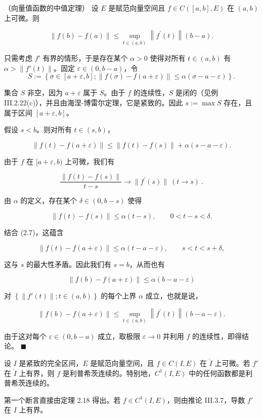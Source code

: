 \begin{theorem}

（向量值函数的中值定理） 设 $E$ 是赋范向量空间且 $f \in C([a, b], E)$ 在 $(a, b)$ 上可微。则

\[
\left\|f(b)-f(a)\right\|\leq\sup_{t\in(a,b)}\left\|f^{\prime}(t)\right\|(b-a).
\]

\proofhead
只需考虑 $f'$ 有界的情形，于是存在某个 $\alpha > 0$ 使得对所有 $t \in (a, b)$ 有 $\alpha > \|f'(t)\|$。固定 $\varepsilon \in (0, b - a)$，令
\begin{equation}
{S}:=\left\{\sigma\in[a+\varepsilon,b];\|f(\sigma)-f(a+\varepsilon)\|\leq\alpha(\sigma-a-\varepsilon)\right\}.
\end{equation}

集合 $S$ 非空，因为 $a + \varepsilon$ 属于 $S$。由于 $f$ 的连续性，$S$ 是闭的（见例 III.2.22(c)），并且由海涅-博雷尔定理，它是紧致的。因此 $s := \max S$ 存在，且属于区间 $[a + \varepsilon, b]$。

假设 $s < b$。则对所有 $ t \in (s, b) $，

\[
\left\|f(t)-f(a+\varepsilon)\right\|\leq\left\|f(t)-f(s)\right\|+\alpha(s-a-\varepsilon).
\]

由于 $f$ 在 $[a+\varepsilon,b)$ 上可微，我们有

\[
\frac{\|f(t)-f(s)\|}{t-s}\to\|f^{\prime}(s)\|\ (t\to s)~.
\]

由 $ \alpha $ 的定义，存在某个 $ \delta \in (0, b - s) $ 使得

\[
\left\|f(t)-f(s)\right\|\leq\alpha(t-s),\qquad0<t-s<\delta.
\]

结合 (2.7)，这蕴含

\[
\left\|f(t)-f(a+\varepsilon)\right\|\leq\alpha(t-a-\varepsilon),\qquad s<t<s+\delta,
\]

这与 $s$ 的最大性矛盾。因此我们有 $s = b$，从而也有

\[
\left\|f(b)-f(a+\varepsilon)\right\|\leq\alpha(b-a-\varepsilon)
\]

对 $ \left\{ \|f'(t)\| ; t \in (a,b) \right\} $ 的每个上界 $ \alpha $ 成立，也就是说，

\[
\left\|f(b)-f(a+\varepsilon)\right\|\leq\sup_{t\in(a,b)}\left\|f^{\prime}(t)\right\|(b-a-\varepsilon).
\]

由于这对每个 $ \varepsilon \in (0, b - a) $ 成立，取极限 $ \varepsilon \to 0 $ 并利用 $ f $ 的连续性，即得结论。 $ \blacksquare $

\end{theorem}

\begin{corollary}

设 $I$ 是紧致的完全区间，$E$ 是赋范向量空间，且 $f \in C(I, E)$ 在 $\mathring{I}$ 上可微。若 $f'$ 在 $\mathring{I}$ 上有界，则 $f$ 是利普希茨连续的。特别地，$C^1(I, E)$ 中的任何函数都是利普希茨连续的。

\proofhead
第一个断言直接由定理 2.18 得出。若 $ f \in C^1(I, E) $，则由推论 III.3.7，导数 $ f' $ 在 $ I $ 上有界。
\end{corollary}

